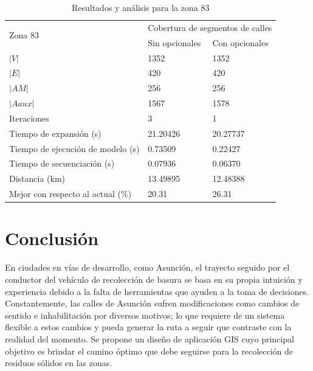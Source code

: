 \documentclass[spanish, conference]{IEEEtran}
\begin{document}
\begin{table}[htbp]
\caption{Resultados y análisis para la zona 83}
\begin{tabular}{lll}
\hline
\multirow{2}{*}{Zona 83}                            & \multicolumn{2}{l}{Cobertura de segmentos de calles} \\ \cline{2-3} 
                                                    & Sin opcionales           & Con opcionales           \\ \hline
$|V|$                                                   & 1352                     & 1352                     \\
$|E|$                                                   & 420                      & 420                      \\
$|AM|$                                                  & 256                      & 256                      \\
$|Aaux|$                                                & 1567                     & 1578                     \\
Iteraciones                                         & 3                        & 1                        \\
Tiempo de expansión (s)                      & 21.20426                 & 20.27737                 \\ 
Tiempo de ejecución de modelo (s)            & 0.73509                  & 0.22427                  \\ 
Tiempo de secuenciación (s)                  & 0.07936                  & 0.06370                  \\ 
Distancia (km)                                      & 13.49895                 & 12.48388                 \\ 
Mejor con respecto al actual (\%) & 20.31                    & 26.31                    \\ \hline
\end{tabular}
\label{table:comparacionZona83}
\end{table}

\section{Conclusión}

En ciudades en vías de desarrollo, como Asunción, el trayecto seguido por el conductor del vehículo de recolección de basura se basa en su propia intuición y experiencia debido a la falta de herramientas que ayuden a la toma de decisiones. Constantemente, las calles de Asunción sufren modificaciones como cambios de sentido e inhabilitación por diversos motivos; lo que requiere de un sistema flexible a estos cambios y pueda generar la ruta a seguir que contraste con la realidad del momento. Se propone un diseño de aplicación GIS cuyo principal objetivo es brindar el camino óptimo que debe seguirse para la recolección de residuos sólidos en las zonas.
\end{document}
